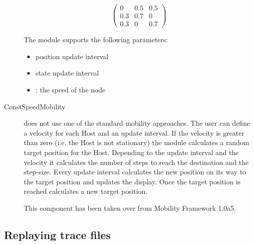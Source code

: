 \begin{description}
$$ \left(
\begin{array}{ccc}
  0 & 0.5 & 0.5 \\
  0.3 & 0.7 & 0 \\
  0.3 & 0 & 0.7
\end{array}
\right) $$

The  module supports the following parameters:
\begin{itemize}
  \item {} position update interval
  \item {} state update interval
  \item {}: the speed of the node
\end{itemize}



\item[ConstSpeedMobility]

 does not use one of the standard mobility
approaches. The user can define a velocity for each Host and an update interval. If
the velocity is greater than zero (i.e. the Host is not stationary) the
 module calculates a random target position for the
Host. Depending to the update interval and the velocity it calculates the number of
steps to reach the destination and the step-size. Every update interval
 calculates the new position on its way to the
target position and updates the display. Once the target position is reached
 calculates a new target position.

This component has been taken over from Mobility Framework 1.0a5.


\end{description}

\subsection{Replaying trace files}

